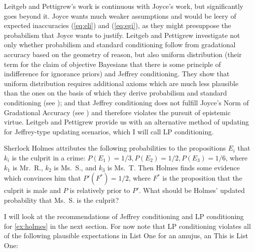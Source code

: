 \documentclass[phd,12pt,oneside]{ubcthesis}
\begin{document}
Leitgeb and Pettigrew's work is continuous with Joyce's work, but
significantly goes beyond it. Joyce wants much weaker assumptions and
would be leery of expected inaccuracies (\ref{eq:eli}) and
(\ref{eq:egi}), as they might presuppose the probabilism that Joyce
wants to justify. Leitgeb and Pettigrew investigate not only whether
probabilism and standard conditioning follow from gradational accuracy
based on the geometry of reason, but also uniform distribution (their
term for the claim of objective Bayesians that there is some principle
of indifference for ignorance priors) and Jeffrey conditioning. They
show that uniform distribution requires additional axioms which are
much less plausible than the ones on the basis of which they derive
probabilism and standard conditioning (see
); and that Jeffrey conditioning
does not fulfill Joyce's Norm of Gradational Accuracy (see
) and therefore violates the pursuit of
epistemic virtue. Leitgeb and Pettigrew provide us with an alternative
method of updating for Jeffrey-type updating scenarios, which I will
call LP conditioning.

\begin{quotex}
  \label{ex:holmes} Sherlock Holmes
  attributes the following probabilities to the propositions $E_{i}$
  that $k_{i}$ is the culprit in a crime:
  $P(E_{1})=1/3,P(E_{2})=1/2,P(E_{3})=1/6$, where $k_{1}$ is Mr.\ R.,
  $k_{2}$ is Ms.\ S., and $k_{3}$ is Ms.\ T. Then Holmes finds some
  evidence which convinces him that $P'(F^{*})=1/2$, where $F^{*}$ is
  the proposition that the culprit is male and $P$ is relatively prior
  to $P'$. What should be Holmes' updated probability that Ms.\ S. is
  the culprit?
\end{quotex}

I will look at the recommendations of Jeffrey conditioning and LP
conditioning for {\xample} \ref{ex:holmes} in the next section. For
now note that LP conditioning violates all of the following plausible
expectations in List One\label{page:listone} for an amujus, an
 This is List One:
\end{document}
